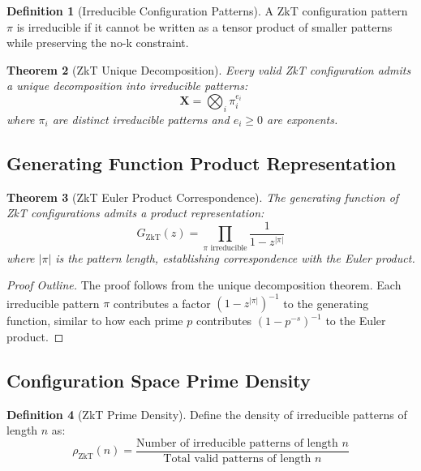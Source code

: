 \documentclass[12pt]{article}
\theoremstyle{plain}
\newtheorem{theorem}{Theorem}[section]
\theoremstyle{definition}
\newtheorem{definition}[theorem]{Definition}
\begin{document}
\begin{definition}[Irreducible Configuration Patterns]
A ZkT configuration pattern $\pi$ is irreducible if it cannot be written as a tensor product of smaller patterns while preserving the no-k constraint.
\end{definition}

\begin{theorem}[ZkT Unique Decomposition]
Every valid ZkT configuration admits a unique decomposition into irreducible patterns:
\begin{equation}
\mathbf{X} = \bigotimes_{i} \pi_i^{e_i}
\end{equation}
where $\pi_i$ are distinct irreducible patterns and $e_i \geq 0$ are exponents.
\end{theorem}

\subsection{Generating Function Product Representation}

\begin{theorem}[ZkT Euler Product Correspondence]
The generating function of ZkT configurations admits a product representation:
\begin{equation}
G_{\text{ZkT}}(z) = \prod_{\pi \text{ irreducible}} \frac{1}{1 - z^{|\pi|}}
\end{equation}
where $|\pi|$ is the pattern length, establishing correspondence with the Euler product.
\end{theorem}

\begin{proof}[Proof Outline]
The proof follows from the unique decomposition theorem. Each irreducible pattern $\pi$ contributes a factor $(1 - z^{|\pi|})^{-1}$ to the generating function, similar to how each prime $p$ contributes $(1 - p^{-s})^{-1}$ to the Euler product.
\end{proof}

\subsection{Configuration Space Prime Density}

\begin{definition}[ZkT Prime Density]
Define the density of irreducible patterns of length $n$ as:
\begin{equation}
\rho_{\text{ZkT}}(n) = \frac{\text{Number of irreducible patterns of length } n}{\text{Total valid patterns of length } n}
\end{equation}
\end{definition}
\end{document}

